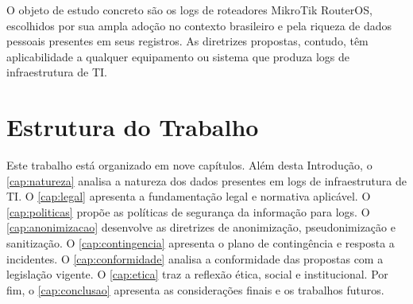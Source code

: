 O objeto de estudo concreto são os logs de roteadores MikroTik RouterOS, escolhidos por sua ampla adoção no contexto brasileiro e pela riqueza de dados pessoais presentes em seus registros. As diretrizes propostas, contudo, têm aplicabilidade a qualquer equipamento ou sistema que produza logs de infraestrutura de TI.

\section{Estrutura do Trabalho}
\label{sec:estrutura}

Este trabalho está organizado em nove capítulos. Além desta Introdução, o \autoref{cap:natureza} analisa a natureza dos dados presentes em logs de infraestrutura de TI. O \autoref{cap:legal} apresenta a fundamentação legal e normativa aplicável. O \autoref{cap:politicas} propõe as políticas de segurança da informação para logs. O \autoref{cap:anonimizacao} desenvolve as diretrizes de anonimização, pseudonimização e sanitização. O \autoref{cap:contingencia} apresenta o plano de contingência e resposta a incidentes. O \autoref{cap:conformidade} analisa a conformidade das propostas com a legislação vigente. O \autoref{cap:etica} traz a reflexão ética, social e institucional. Por fim, o \autoref{cap:conclusao} apresenta as considerações finais e os trabalhos futuros.